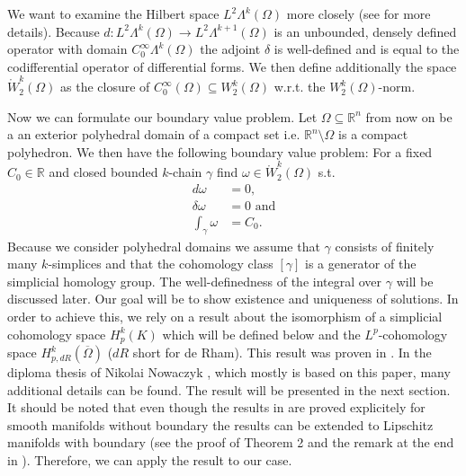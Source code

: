 \documentclass[12pt,a4paper]{article}
\theoremstyle{definition}
\newcommand{\omegabar}{\overline{\Omega}}
\newcommand{\real}{\mathbb{R}}
\begin{document}
We want to examine the Hilbert space $L^2\Lambda^k(\Omega)$ more closely
(see \cite[Sec. 6.2.6]{arnold} for more details).  
Because $d:L^2\Lambda^k(\Omega) \rightarrow L^2\Lambda^{k+1}(\Omega)$
is an unbounded, densely defined operator with domain 
$C_0^\infty \Lambda^{k}(\Omega)$ the adjoint $\delta$ is well-defined and is 
equal to the codifferential operator of differential forms. We then define 
additionally the space $\mathring{W}^k_2(\Omega)$ as the closure of 
$C_0^\infty(\Omega) \subseteq W^k_2(\Omega)$ w.r.t. the $W^k_2(\Omega)$-norm.









Now we can formulate our boundary value problem. Let $\Omega \subseteq \real^n$ 
from now on be a an exterior polyhedral domain of a compact set i.e. 
$\real^n \setminus \Omega$ 
is a compact polyhedron. We then have the following boundary value
problem: For a fixed $C_0 \in \real$ and closed bounded $k$-chain $\gamma$ 
find $\omega \in \mathring{W}^k_2(\Omega)$ s.t.
\begin{align*}
    d\omega &= 0, \\
    \delta\omega &= 0 \text{ and} \\
    \int_\gamma \omega &= C_0.
\end{align*}
Because we consider polyhedral domains we assume that $\gamma$ consists of 
finitely many $k$-simplices and that the cohomology class $[\gamma]$ is a 
generator of the simplicial homology group. The well-definedness of the 
integral over $\gamma$ will be discussed later.
Our goal will be to show existence and uniqueness of solutions. In order to 
achieve this, we rely on a result about the isomorphism of a simplicial 
cohomology space $H^k_p(K)$ which will be defined below
and the $L^p$-cohomology space $H^k_{p,dR}(\omegabar)$ ($dR$ short for de Rham).
This result was proven in \cite{goldshtein}. In the diploma thesis of Nikolai
Nowaczyk \cite{nowaczyk}, which mostly is based on this paper, 
many additional details can be found. The result will be presented in the
next section. It should be noted that even though the results in 
\cite{goldshtein} are
proved explicitely for smooth manifolds without boundary the results can be 
extended to Lipschitz manifolds with boundary (see the proof of Theorem 2 and 
the remark at the end in \cite{goldshtein}). Therefore, we can apply the result
to our case.
\end{document}
